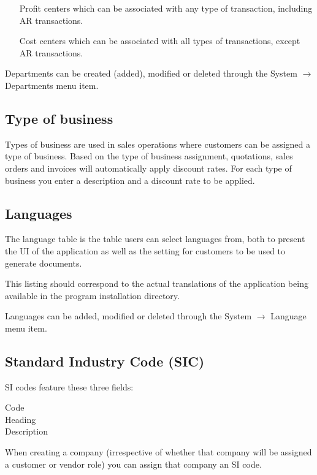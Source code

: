 \documentclass[10pt,A4]{book}
\begin{document}
\begin{itemize}
\item [Profit centers] which can be associated with any type of transaction, including AR transactions.
\item [Cost centers] which can be associated with all types of transactions, except AR transactions.
\end{itemize}

Departments can be created (added), modified or deleted through the System $\rightarrow$ Departments menu item.

\subsection{Type of business}

Types of business are used in sales operations where customers can be assigned a type
of business. Based on the type of business assignment, quotations, sales orders and
invoices will automatically apply discount rates. For each type of business you enter a description and a discount rate to be applied.

\subsection{Languages}

The language table is the table users can select languages from, both to present
the UI of the application as well as the setting for customers to be used to generate
documents.

This listing should correspond to the actual translations of the application being
available in the program installation directory.

Languages can be added, modified or deleted through the System $\rightarrow$ Language menu item.

\subsection{Standard Industry Code (SIC)}

SI codes feature these three fields:

\begin{description}
\item [Code]
\item [Heading]
\item [Description]
\end{description}

When creating a company (irrespective of whether that company will be assigned a customer
or vendor role) you can assign that company an SI code.
\end{document}
